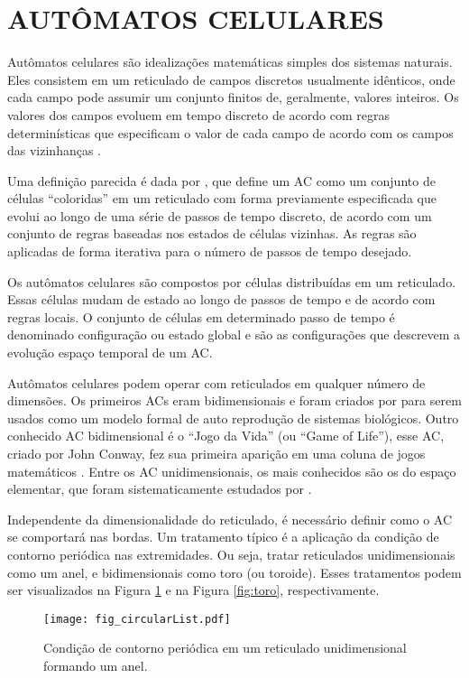 \section{AUTÔMATOS CELULARES}
\label{sec:acs}

Autômatos celulares são idealizações matemáticas simples dos sistemas naturais. Eles consistem em um reticulado de campos discretos usualmente idênticos, onde cada campo pode assumir um conjunto finitos de, geralmente, valores inteiros. Os valores dos campos evoluem em tempo discreto de acordo com regras determinísticas que especificam o valor de cada campo de acordo com os campos das vizinhanças \cite{wolfram1994cellular}.

Uma definição parecida é dada por , que define um AC como um conjunto de células ``coloridas'' em um reticulado com forma previamente especificada que evolui ao longo de uma série de passos de tempo discreto, de acordo com um conjunto de regras baseadas nos estados de células vizinhas. As regras são aplicadas de forma iterativa para o número de passos de tempo desejado.

Os autômatos celulares são compostos por células distribuídas em um reticulado. Essas células mudam de estado ao longo de passos de tempo e de acordo com regras locais. O conjunto de células em determinado passo de tempo é denominado configuração ou estado global e são as configurações que descrevem a evolução espaço temporal de um AC. 

Autômatos celulares podem operar com reticulados em qualquer número de dimensões. Os primeiros ACs eram bidimensionais e foram criados por  para serem usados como um modelo formal de auto reprodução de sistemas biológicos. Outro conhecido AC bidimensional é o ``Jogo da Vida'' (ou ``Game of Life''), esse AC, criado por John Conway, fez sua primeira aparição em uma coluna de jogos matemáticos \cite{GardnerM1970}. Entre os AC unidimensionais, os mais conhecidos são os do espaço elementar, que foram sistematicamente estudados por .

Independente da dimensionalidade do reticulado, é necessário definir como o AC se comportará nas bordas. Um tratamento típico é a aplicação da condição de contorno periódica nas extremidades. Ou seja, tratar reticulados unidimensionais como um anel, e bidimensionais como toro (ou toroide). Esses tratamentos podem ser visualizados na Figura \ref{fig:anel} e na Figura \ref{fig:toro}, respectivamente.  
	\begin{figure}[h!]
	  \centering
	  \texttt{[image: fig\_circularList.pdf]}
	  \caption{Condição de contorno periódica em um reticulado unidimensional formando um anel.}
	  \label{fig:anel}
	\end{figure}


